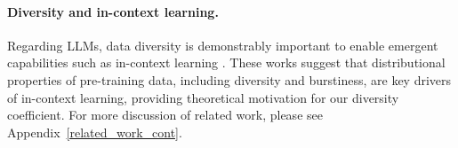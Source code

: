 \paragraph{Diversity and in-context learning.}
Regarding LLMs, data diversity is demonstrably important to enable emergent capabilities such as in-context learning \citep{xie2022explanation, shin2022effect, chan2022data}.
These works suggest that distributional properties of pre-training data, including diversity and burstiness, are key drivers of in-context learning, providing theoretical motivation for our diversity coefficient.
For more discussion of related work, please see Appendix~\ref{related_work_cont}.


